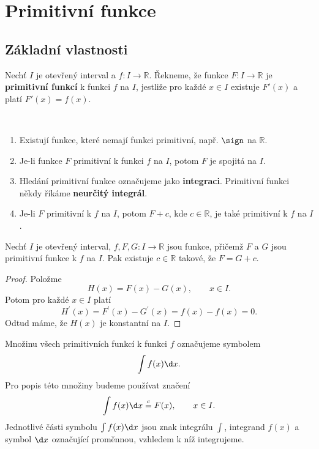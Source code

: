 \section{Primitivní funkce}
\subsection{Základní vlastnosti}
\begin{definice}
Nechť $I$ je otevřený interval a $f : I \to \mathbb{R}$. Řekneme, že funkce $F : I \to \mathbb{R}$
je \textbf{primitivní funkcí} k funkci $f$ na $I$, jestliže pro každé $x \in I$ existuje $F'(x)$ a platí $F'(x) = f(x)$.
\end{definice}

\begin{poznamka}
	\,
	\begin{enumerate}[(1)]
		\item Existují funkce, které nemají funkci primitivní, např. $\sign$ na $\mathbb R $.
		\item Je-li funkce $F$ primitivní k funkci $f$ na $I$, potom $F$ je spojitá na $I$.
		\item Hledání primitivní funkce označujeme jako \textbf{integraci}. Primitivní funkci někdy říkáme
		\textbf{neurčitý integrál}.
		\item Je-li $F$ primitivní k $f$ na $I$, potom $F+c$, kde $c \in \mathbb R $, je také
		primitivní k $f$ na $I$.
	\end{enumerate}
\end{poznamka}

\begin{veta}\label{veta8.1}
Nechť $I$ je otevřený interval, $f, F, G : I \to \mathbb{R}$ jsou funkce, přičemž $F$ a $G$ jsou primitivní funkce k $f$ na $I$. Pak existuje $c \in \mathbb{R}$ takové, že
$F = G + c$.
\end{veta}

\begin{proof}
	Položme
	$$
	    H(x)=F(x)-G(x), \qquad x \in I.
	$$
	Potom pro každé $x\in I$ platí
	$$
	    H^\prime(x) = F^\prime(x) - G^\prime(x) = f(x)-f(x)=0.
	$$
	Odtud máme, že $H(x)$ je konstantní na $I$.
\end{proof}

\begin{oznaceni}
Množinu všech primitivních funkcí k funkci $f$ označujeme symbolem
\[
\int f(x) \d x.
\]
Pro popis této množiny budeme používat značení
\[
\int f(x) \d x \stackrel{c}{=} F(x), \qquad x \in I.
\]
Jednotlivé části symbolu $\int f(x) \d x$ jsou znak integrálu $\int$, integrand $f(x)$ a symbol $\d x$ označující proměnnou, vzhledem k níž integrujeme.
\end{oznaceni}


